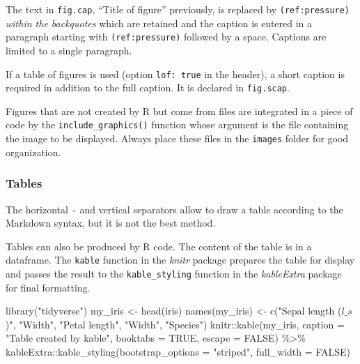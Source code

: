\documentclass[
  12pt,
  american,
  a4paper,
  extrafontsizes,onecolumn,openright
  ]{memoir}
\newenvironment{Shaded}{\begin{snugshade}}{\end{snugshade}}
\newcommand{\AttributeTok}[1]{\textcolor[rgb]{0.77,0.63,0.00}{#1}}
\newcommand{\ConstantTok}[1]{\textcolor[rgb]{0.00,0.00,0.00}{#1}}
\newcommand{\FunctionTok}[1]{\textcolor[rgb]{0.00,0.00,0.00}{#1}}
\newcommand{\NormalTok}[1]{#1}
\newcommand{\OtherTok}[1]{\textcolor[rgb]{0.56,0.35,0.01}{#1}}
\newcommand{\SpecialCharTok}[1]{\textcolor[rgb]{0.00,0.00,0.00}{#1}}
\newcommand{\StringTok}[1]{\textcolor[rgb]{0.31,0.60,0.02}{#1}}
\begin{document}
\normalsize

The text in \texttt{fig.cap}, \enquote{Title of figure} previously, is replaced by \texttt{(ref:pressure)} \emph{within the backquotes} which are retained and the caption is entered in a paragraph starting with \texttt{(ref:pressure)} followed by a space.
Captions are limited to a single paragraph.

If a table of figures is used (option \texttt{lof:\ true} in the header), a short caption is required in addition to the full caption.
It is declared in \texttt{fig.scap}.

Figures that are not created by R but come from files are integrated in a piece of code by the \texttt{include\_graphics()} function whose argument is the file containing the image to be displayed.
Always place these files in the \texttt{images} folder for good organization.

\hypertarget{tables}{%
\subsubsection{Tables}\label{tables}}

The horizontal \texttt{-} and vertical \texttt{\textbar{}} separators allow to draw a table according to the Markdown syntax, but it is not the best method.

Tables can also be produced by R code.
The content of the table is in a dataframe.
The \texttt{kable} function in the \emph{knitr} package prepares the table for display and passes the result to the \texttt{kable\_styling} function in the \emph{kableExtra} package for final formatting.

\scriptsize

\begin{Shaded}
\begin{Highlighting}[]
\FunctionTok{library}\NormalTok{(}\StringTok{"tidyverse"}\NormalTok{)}
\NormalTok{my\_iris }\OtherTok{\textless{}{-}} \FunctionTok{head}\NormalTok{(iris)}
\FunctionTok{names}\NormalTok{(my\_iris) }\OtherTok{\textless{}{-}} \FunctionTok{c}\NormalTok{(}\StringTok{"Sepal length ($l\_s$)"}\NormalTok{, }\StringTok{"Width"}\NormalTok{, }\StringTok{"Petal length"}\NormalTok{,}
    \StringTok{"Width"}\NormalTok{, }\StringTok{"Species"}\NormalTok{)}
\NormalTok{knitr}\SpecialCharTok{::}\FunctionTok{kable}\NormalTok{(my\_iris, }\AttributeTok{caption =} \StringTok{"Table created by kable"}\NormalTok{, }\AttributeTok{booktabs =} \ConstantTok{TRUE}\NormalTok{,}
    \AttributeTok{escape =} \ConstantTok{FALSE}\NormalTok{) }\SpecialCharTok{\%\textgreater{}\%}
\NormalTok{    kableExtra}\SpecialCharTok{::}\FunctionTok{kable\_styling}\NormalTok{(}\AttributeTok{bootstrap\_options =} \StringTok{"striped"}\NormalTok{,}
        \AttributeTok{full\_width =} \ConstantTok{FALSE}\NormalTok{)}
\end{Highlighting}
\end{Shaded}
\end{document}
